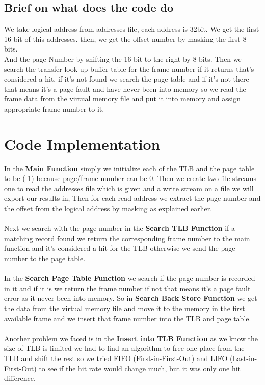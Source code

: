 \documentclass[landscape,17pt]{extarticle}
\begin{document}
\subsection{Brief on what does the code do}
 We take logical address from addresses file, each address is 32bit.
We get the first 16 bit of this addresses.
then, we get the offset number by masking the first 8 bits.\\
And the page Number by shifting the 16 bit to the right by 8 bits. Then we search the transfer look-up buffer table for the frame number if it returns that's considered a hit, if it's not found we search the page table and if it's not there that means it's a page fault and have never been into memory so we read the frame data from the virtual memory file and put it into memory and assign appropriate frame number to it.
\section{Code Implementation}
In the \hypertarget{main}{\textbf{Main Function}} simply we initialize each of the TLB and the page table to be (-1) because page/frame number can be 0.
Then we create two file streams one to read the addresses file which is given and a write stream on a file we will export our results in, Then for each read address we extract the page number and the offset from the logical address by masking as explained earlier.\\\\
Next we search with the page number in the \hypertarget{tlb}{\textbf{Search TLB Function}} if a matching record found we return the corresponding frame number to the main function and it's considered a hit for the TLB otherwise we send the page number to the page table.\\\\
In the  \hypertarget{pt}{\textbf{Search Page Table Function}} we search if the page number is recorded in it and if it is we return the frame number if not that means it's a page fault error as it never been into memory.
So in  \hypertarget{bs}{\textbf{Search Back Store Function}} we get the data from the virtual memory file and move it to the memory in the first available frame and we insert that frame number into the TLB and page table.\\\\
Another problem we faced is in the \hypertarget{itlb}{\textbf{Insert into TLB Function}} as we know the size of TLB is limited we had to find an algorithm to free one place from the TLB and shift the rest so we tried FIFO (First-in-First-Out) and LIFO (Last-in-First-Out) to see if the hit rate would change much, but it was only one hit difference.
\end{document}
